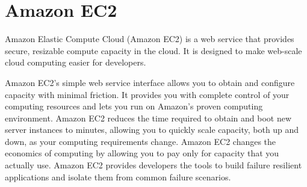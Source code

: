 \section{Amazon EC2}
Amazon Elastic Compute Cloud (Amazon EC2) is a web service that provides
secure, resizable compute capacity in the cloud. It is designed to make
web-scale cloud computing easier for developers.

Amazon EC2’s simple web service interface allows you to obtain and configure
capacity with minimal friction. It provides you with complete control of your
computing resources and lets you run on Amazon’s proven computing environment.
Amazon EC2 reduces the time required to obtain and boot new server instances
to minutes, allowing you to quickly scale capacity, both up and down, as your
computing requirements change. Amazon EC2 changes the economics of computing
by allowing you to pay only for capacity that you actually use. Amazon EC2
provides developers the tools to build failure resilient applications and
isolate them from common failure scenarios\cite{www-amazonec2}.
